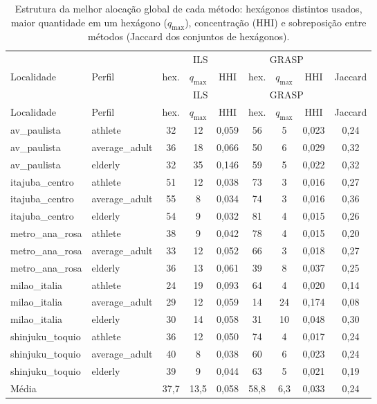 \documentclass[11pt,a4paper]{article}
\begin{document}
\renewcommand{\arraystretch}{1.12}
\begin{longtable}{@{}l l c c c c c c c@{}}
\caption{Estrutura da melhor alocação global de cada método: hexágonos distintos usados, maior quantidade em um hexágono ($q_{\max}$), concentração (HHI) e sobreposição entre métodos (Jaccard dos conjuntos de hexágonos).}\label{tab:comp-alloc}\\
\toprule
& & \multicolumn{3}{c}{ILS} & \multicolumn{3}{c}{GRASP} & \\
\cmidrule(lr){3-5}\cmidrule(lr){6-8}
Localidade & Perfil & hex. & $q_{\max}$ & HHI & hex. & $q_{\max}$ & HHI & Jaccard \\
\midrule
\endfirsthead
\toprule
& & \multicolumn{3}{c}{ILS} & \multicolumn{3}{c}{GRASP} & \\
\cmidrule(lr){3-5}\cmidrule(lr){6-8}
Localidade & Perfil & hex. & $q_{\max}$ & HHI & hex. & $q_{\max}$ & HHI & Jaccard \\
\midrule
\endhead
av\_paulista & athlete & 32 & 12 & 0,059 & 56 & 5 & 0,023 & 0,24 \\
av\_paulista & average\_adult & 36 & 18 & 0,066 & 50 & 6 & 0,029 & 0,32 \\
av\_paulista & elderly & 32 & 35 & 0,146 & 59 & 5 & 0,022 & 0,32 \\
itajuba\_centro & athlete & 51 & 12 & 0,038 & 73 & 3 & 0,016 & 0,27 \\
itajuba\_centro & average\_adult & 55 & 8 & 0,034 & 74 & 3 & 0,016 & 0,36 \\
itajuba\_centro & elderly & 54 & 9 & 0,032 & 81 & 4 & 0,015 & 0,26 \\
metro\_ana\_rosa & athlete & 38 & 9 & 0,042 & 78 & 4 & 0,015 & 0,20 \\
metro\_ana\_rosa & average\_adult & 33 & 12 & 0,052 & 66 & 3 & 0,018 & 0,27 \\
metro\_ana\_rosa & elderly & 36 & 13 & 0,061 & 39 & 8 & 0,037 & 0,25 \\
milao\_italia & athlete & 24 & 19 & 0,093 & 64 & 4 & 0,020 & 0,14 \\
milao\_italia & average\_adult & 29 & 12 & 0,059 & 14 & 24 & 0,174 & 0,08 \\
milao\_italia & elderly & 30 & 14 & 0,058 & 31 & 10 & 0,048 & 0,30 \\
shinjuku\_toquio & athlete & 36 & 12 & 0,050 & 74 & 4 & 0,017 & 0,24 \\
shinjuku\_toquio & average\_adult & 40 & 8 & 0,038 & 60 & 6 & 0,023 & 0,24 \\
shinjuku\_toquio & elderly & 39 & 9 & 0,044 & 63 & 5 & 0,021 & 0,19 \\
\midrule
\multicolumn{2}{l}{Média} & 37,7 & 13,5 & 0,058 & 58,8 & 6,3 & 0,033 & 0,24 \\
\bottomrule
\end{longtable}
\end{document}
